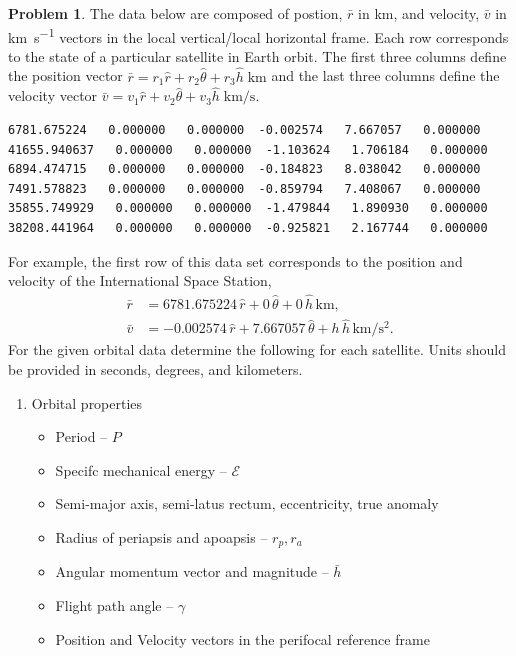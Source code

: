 \documentclass[10pt]{article}
\theoremstyle{definition}
\newtheorem{prob}{Problem}[section]
\newenvironment{subprob}%
{\renewcommand{\theenumi}{\alph{enumi}}\renewcommand{\labelenumi}{(\theenumi)}\begin{enumerate}}%
{\end{enumerate}}%
\begin{document}
\clearpage\newpage
\begin{prob}
    The data below are composed of postion, \( \bar r \) in \si{\kilo\meter}, and velocity, \( \bar v \) in \si{\kilo\meter\per\second} vectors in the local vertical/local horizontal frame. 
    Each row corresponds to the state of a particular satellite in Earth orbit. 
    The first three columns define the position vector \( \bar r = r_1 \hat r + r_2 \hat \theta + r_3 \hat h \; \si{\kilo\meter} \) and the last three columns define the velocity vector \( \bar v = v_1 \hat r + v_2 \hat \theta + v_3 \hat h \; \si{\kilo\meter\per\second} \).

    \begin{verbatim}
6781.675224   0.000000   0.000000  -0.002574   7.667057   0.000000
41655.940637   0.000000   0.000000  -1.103624   1.706184   0.000000
6894.474715   0.000000   0.000000  -0.184823   8.038042   0.000000
7491.578823   0.000000   0.000000  -0.859794   7.408067   0.000000
35855.749929   0.000000   0.000000  -1.479844   1.890930   0.000000
38208.441964   0.000000   0.000000  -0.925821   2.167744   0.000000
    \end{verbatim}
For example, the first row of this data set corresponds to the position and velocity of the International Space Station,
\begin{align*}
    \bar r &= 6781.675224 \, \hat r + 0 \, \hat \theta + 0 \, \hat h \, \si{\kilo\meter}, \\
    \bar v &= -0.002574 \, \hat r + 7.667057 \, \hat \theta + h \, \hat h \, \si{\kilo\meter\per\second\squared}.
\end{align*}
    For the given orbital data determine the following for each satellite.
    Units should be provided in seconds, degrees, and kilometers.

    \begin{subprob}
    \item Orbital properties
    \begin{itemize}
        \item Period -- \( P \) 
        \item Specifc mechanical energy -- \( \mathcal{E} \) 
        \item Semi-major axis, semi-latus rectum, eccentricity, true anomaly
        \item Radius of periapsis and apoapsis -- \( r_p, r_a \)
        \item Angular momentum vector and magnitude -- \( \bar h \)
        \item Flight path angle -- \( \gamma \)
        \item Position and Velocity vectors in the perifocal reference frame
    \end{itemize}


\end{subprob}
\end{prob}
\end{document}

